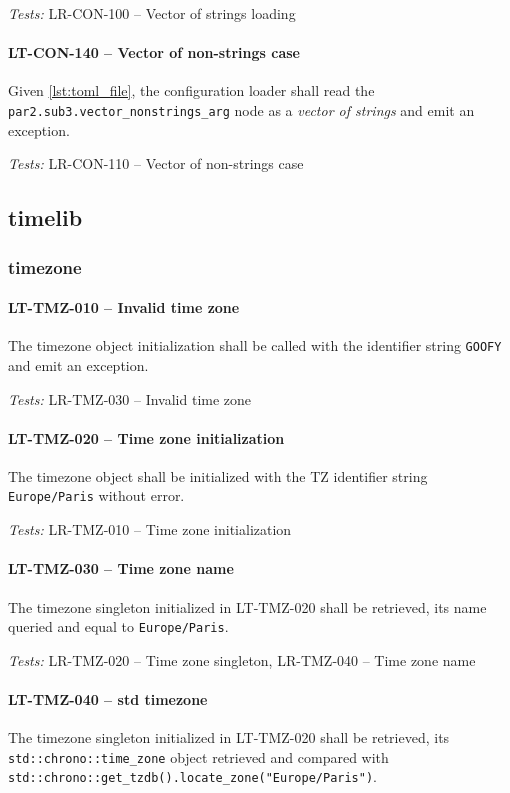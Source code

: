 \textit{Tests: } LR-CON-100 -- Vector of strings loading

\paragraph{LT-CON-140 -- Vector of non-strings case}
Given \cref{lst:toml_file}, the configuration loader shall read the
\lstinline{par2.sub3.vector_nonstrings_arg} node as a \emph{vector of strings}
and emit an exception.

\textit{Tests: } LR-CON-110 -- Vector of non-strings case

\subsection{time\textunderscore lib}
\subsubsection{time\textunderscore zone}
\paragraph{LT-TMZ-010 -- Invalid time zone}
The time\textunderscore zone object initialization shall be called with
the identifier string \lstinline{GOOFY} and emit an exception.

\textit{Tests: } LR-TMZ-030 -- Invalid time zone

\paragraph{LT-TMZ-020 -- Time zone initialization}
The time\textunderscore zone object shall be initialized with the TZ
identifier string \lstinline{Europe/Paris} without error.

\textit{Tests: } LR-TMZ-010 -- Time zone initialization

\paragraph{LT-TMZ-030 -- Time zone name}
The time\textunderscore zone singleton initialized in LT-TMZ-020 shall
be retrieved, its name queried and equal to \lstinline{Europe/Paris}.

\textit{Tests: } LR-TMZ-020 -- Time zone singleton,
                 LR-TMZ-040 -- Time zone name

\paragraph{LT-TMZ-040 -- std time\textunderscore zone}
The time\textunderscore zone singleton initialized in LT-TMZ-020 shall
be retrieved, its \lstinline{std::chrono::time_zone} object retrieved
and compared with
\lstinline{std::chrono::get_tzdb().locate_zone("Europe/Paris")}.


